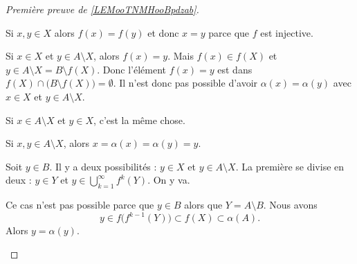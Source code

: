 \begin{proof}[Première preuve de \ref{LEMooTNMHooBpdzab}]
\begin{subproof}
		Si \( x,y\in X\) alors \( f(x)=f(y)\) et donc \( x=y\) parce que \( f\) est injective.

		Si \( x\in X\) et \( y\in A\setminus X\), alors \( f(x)=y\). Mais \( f(x)\in f(X)\) et \( y\in A\setminus X=B\setminus f(X)\). Donc l'élément \( f(x)=y\) est dans \( f(X)\cap \big( B\setminus f(X) \big)=\emptyset\). Il n'est donc pas possible d'avoir \( \alpha(x)=\alpha(y)\) avec \( x\in X\) et \( y\in A\setminus X\).

		Si \( x\in A\setminus X\) et \( y\in X\), c'est la même chose.

		Si \( x,y\in A\setminus X\), alors \( x=\alpha(x)=\alpha(y)=y\).

		\spitem[Surjective]
		Soit \( y\in B\). Il y a deux possibilités : \( y\in X\) et \( y\in A\setminus X\). La première se divise en deux : \( y\in Y\) et \( y\in \bigcup_{k=1}^{\infty}f^k(Y)\). On y va.

		\begin{subproof}
			\spitem[\( y\in Y\)]
			Ce cas n'est pas possible parce que \( y\in B\) alors que \( Y=A\setminus B\).
			Nous avons
			\begin{equation}
				y\in f\big( f^{k-1}(Y) \big)\subset f(X)\subset \alpha(A).
			\end{equation}
			\spitem[\( y\in A\setminus X\)]
			Alors \( y=\alpha(y)\).
		\end{subproof}
	\end{subproof}
\end{proof}


